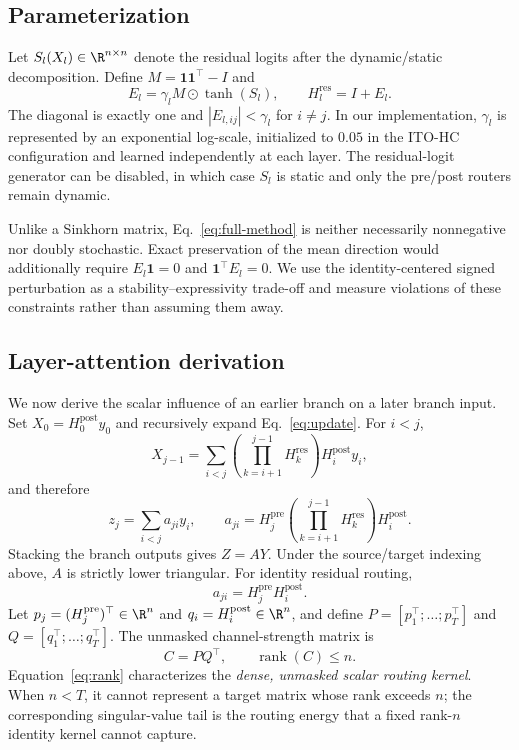 \documentclass{article}
\newcommand{\Hpre}{H^{\mathrm{pre}}}
\newcommand{\Hpost}{H^{\mathrm{post}}}
\newcommand{\Hres}{H^{\mathrm{res}}}
\begin{document}
\subsection{Parameterization}
Let $S_l(X_l)\in\R^{n\times n}$ denote the residual logits after the dynamic/static decomposition. Define $M=\mathbf 1\mathbf 1^\top-I$ and
\begin{equation}
 E_l=\gamma_l M\odot\tanh(S_l),\qquad \Hres_l=I+E_l.
 \label{eq:full-method}
\end{equation}
The diagonal is exactly one and $|E_{l,ij}|<\gamma_l$ for $i\ne j$. In our implementation, $\gamma_l$ is represented by an exponential log-scale, initialized to $0.05$ in the ITO-HC configuration and learned independently at each layer. The residual-logit generator can be disabled, in which case $S_l$ is static and only the pre/post routers remain dynamic.

Unlike a Sinkhorn matrix, Eq.~\ref{eq:full-method} is neither necessarily nonnegative nor doubly stochastic. Exact preservation of the mean direction would additionally require $E_l\mathbf 1=0$ and $\mathbf 1^\top E_l=0$. We use the identity-centered signed perturbation as a stability--expressivity trade-off and measure violations of these constraints rather than assuming them away.

\subsection{Layer-attention derivation}
We now derive the scalar influence of an earlier branch on a later branch input. Set $X_0=\Hpost_0y_0$ and recursively expand Eq.~\ref{eq:update}. For $i<j$,
\begin{equation}
 X_{j-1}=\sum_{i<j}\left(\prod_{k=i+1}^{j-1}\Hres_k\right)\Hpost_i y_i,
\end{equation}
and therefore
\begin{equation}
 z_j=\sum_{i<j}a_{ji}y_i,\qquad
 a_{ji}=\Hpre_j\left(\prod_{k=i+1}^{j-1}\Hres_k\right)\Hpost_i.
 \label{eq:aji}
\end{equation}
Stacking the branch outputs gives $Z=AY$. Under the source/target indexing above, $A$ is strictly lower triangular. For identity residual routing,
\begin{equation}
 a_{ji}=\Hpre_j\Hpost_i.
 \label{eq:identity-a}
\end{equation}
Let $p_j=(\Hpre_j)^\top\in\R^n$ and $q_i=\Hpost_i\in\R^n$, and define $P=[p_1^\top;\ldots;p_T^\top]$ and $Q=[q_1^\top;\ldots;q_T^\top]$. The unmasked channel-strength matrix is
\begin{equation}
 C=PQ^\top,\qquad \operatorname{rank}(C)\le n.
 \label{eq:rank}
\end{equation}
Equation~\ref{eq:rank} characterizes the \emph{dense, unmasked scalar routing kernel}. When $n<T$, it cannot represent a target matrix whose rank exceeds $n$; the corresponding singular-value tail is the routing energy that a fixed rank-$n$ identity kernel cannot capture.
\end{document}
